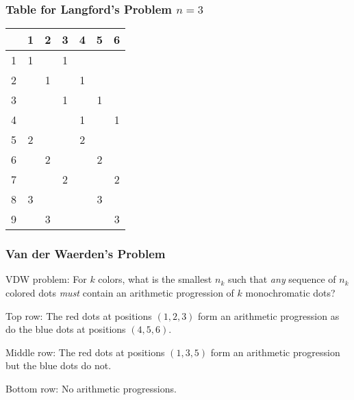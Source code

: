 \documentclass{beamer}
\begin{document}

\begin{frame}
\frametitle{Table for Langford's Problem $n=3$}
\begin{center}
\addtolength{\tabcolsep}{4pt}
\begin{tabular}{|c||c|c|c|c|c|c|}
\hline
&1&2&3&4&5&6\\\hline\hline
1&1&&1&&&\\\hline
2&&1&&1&&\\\hline
3&&&1&&1&\\\hline
4&&&&1&&1\\\hline
5&2&&&2&&\\\hline
6&&2&&&2&\\\hline
7&&&2&&&2\\\hline
8&3&&&&3&\\\hline
9&&3&&&&3\\\hline
\end{tabular}
\end{center}
\end{frame}


\begin{frame}
\frametitle{Van der Waerden's Problem}

VDW problem: For $k$ colors, what is the smallest $n_k$ such that \emph{any} sequence of $n_k$ colored dots \emph{must} contain an arithmetic progression of $k$ monochromatic dots? 

\bigskip

\begin{center}
\end{center}

\pause

\bigskip

Top row: The red dots at positions $(1,2,3)$ form an arithmetic progression as do the blue dots at positions $(4,5,6)$.

\smallskip 

Middle row: The red dots at positions $(1,3,5)$ form an arithmetic progression but the blue dots do not.

\smallskip

Bottom row: No arithmetic progressions.

\end{frame}
\end{document}

